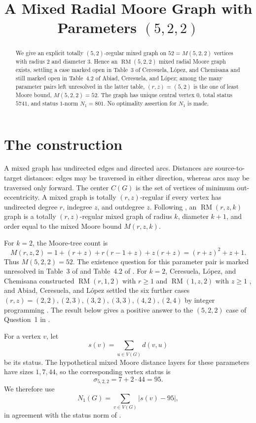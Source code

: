 \documentclass[11pt]{amsart}
\title[An $\RM(5,2,2)$ graph]
{A Mixed Radial Moore Graph with Parameters $(5,2,2)$}
\date{}
\newcommand{\RM}{\operatorname{RM}}
\begin{document}
\begin{abstract}
We give an explicit totally $(5,2)$-regular mixed graph on
$52=M(5,2,2)$ vertices with radius $2$ and diameter $3$. Hence an
$\RM(5,2,2)$ mixed radial Moore graph exists, settling a case marked
open in Table~3 of Ceresuela, L\'opez, and Chemisana and still marked
open in Table~4.2 of Abiad, Ceresuela, and L\'opez; among the many
parameter pairs left unresolved in the latter table, $(r,z)=(5,2)$ is
the one of least Moore bound, $M(5,2,2)=52$. The graph has unique central
vertex $0$, total status $5741$, and status $1$-norm $N_1=801$.
No optimality assertion for $N_1$ is made.
\end{abstract}

\maketitle

\section{The construction}

A mixed graph has undirected edges and directed arcs. Distances are
source-to-target distances: edges may be traversed in either direction,
whereas arcs may be traversed only forward. The center $C(G)$ is the set
of vertices of minimum out-eccentricity. A mixed graph is totally
$(r,z)$-regular if every vertex has undirected degree $r$, indegree $z$,
and outdegree $z$. Following \cite{CLC2023}, an $\RM(r,z,k)$ graph is a
totally $(r,z)$-regular mixed graph of radius $k$, diameter $k+1$, and
order equal to the mixed Moore bound $M(r,z,k)$.

For $k=2$, the Moore-tree count is
\begin{equation}\label{eq:moore-bound}
M(r,z,2)
 =1+(r+z)+r(r-1+z)+z(r+z)
 =(r+z)^2+z+1.
\end{equation}
Thus $M(5,2,2)=52$. The existence question for this parameter pair is
marked unresolved in Table~3 of \cite{CLC2023} and Table~4.2 of
\cite{ACL2026}. For $k=2$,
Ceresuela, L\'opez, and Chemisana constructed
$\RM(r,1,2)$ with $r\ge1$ and $\RM(1,z,2)$ with $z\ge1$
\cite{CLC2023}, and Abiad, Ceresuela, and L\'opez settled the six
further cases $(r,z)=(2,2),(2,3),(3,2),(3,3),(4,2),(2,4)$ by integer
programming \cite{ACL2026}. The result below gives a
positive answer to the $(5,2,2)$ case of Question~1 in \cite{CLC2023}.

For a vertex $v$, let
\[
s(v)=\sum_{u\in V(G)}d(v,u)
\]
be its status. The hypothetical mixed Moore distance layers for these
parameters have sizes $1,7,44$, so the corresponding vertex status is
\begin{equation}\label{eq:moore-status}
\sigma_{5,2,2}=7+2\cdot44=95.
\end{equation}
We therefore use
\[
N_1(G)=\sum_{v\in V(G)}\lvert s(v)-95\rvert,
\]
in agreement with the status norm of \cite{CLC2023}.
\end{document}
